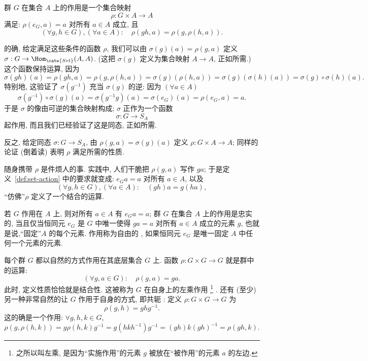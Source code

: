 \begin{definition}
\label{def:set-action}
群 $G$ 在集合 $A$ 上的作用是一个集合映射
\[
\rho : G \times A \to A
\]
满足: $\rho(e_G, a) = a$ 对所有 $a \in A$ 成立, 且
\[
(\forall g, h \in G), (\forall a \in A): \quad \rho(gh, a) = \rho(g, \rho(h, a)).
\]
\end{definition}

的确, 给定满足这些条件的函数 $\rho$, 我们可以由 $\sigma(g)(a) = \rho(g, a)$ 定义 $\sigma : G \to \Hom_{\cate{Set}}(A, A)$. (这把 $\sigma(g)$ 定义为集合映射 $A \to A$, 正如所需.) 这个函数保持运算, 因为
\[
\sigma(gh)(a) = \rho(gh, a) = \rho(g, \rho(h, a)) = \sigma(g)(\rho(h, a)) = \sigma(g)(\sigma(h)(a)) = \sigma(g) \circ \sigma(h)(a).
\]
特别地, 这验证了 $\sigma(g^{-1})$ 充当 $\sigma(g)$ 的逆: 因为 $(\forall a \in A)$
\[
\sigma(g^{-1}) \circ \sigma(g)(a) = \sigma(g^{-1}g)(a) = \sigma(e_G)(a) = \rho(e_G, a) = a.
\]
于是 $\sigma$ 的像由可逆的集合映射构成; $\sigma$ 正作为一个函数
\[
\sigma : G \to S_A
\]
起作用, 而且我们已经验证了这是同态, 正如所需.

反之, 给定同态 $\sigma : G \to S_A$, 由 $\rho(g, a) = \sigma(g)(a)$ 定义 $\rho : G \times A \to A$; 同样的论证 (倒着读) 表明 $\rho$ 满足所需的性质.

随身携带 $\rho$ 是件烦人的事. 实践中, 人们干脆把 $\rho(g, a)$ 写作 $ga$; 于是定义~\ref{def:set-action} 中的要求就变成: $e_G a = a$ 对所有 $a \in A$, 以及
\[
(\forall g, h \in G), (\forall a \in A): \quad (gh)a = g(ha),
\]
``仿佛''$\rho$ 定义了一个结合的运算.

若 $G$ 作用在 $A$ 上, 则对所有 $a \in A$ 有 $e_G a = a$; 群 $G$ 在集合 $A$ 上的作用是忠实的, 当且仅当恒同元 $e_G$ 是 $G$ 中唯一使得 $ga = a$ 对所有 $a \in A$ 成立的元素 $g$, 也就是说,``固定''$A$ 的每个元素. 作用称为自由的%
, 如果恒同元 $e_G$ 是唯一固定 $A$ 中任何一个元素的元素.

\begin{example}
\label{ex:left-multiplication}
每个群 $G$ 都以自然的方式作用在其底层集合 $G$ 上. 函数 $\rho : G \times G \to G$ 就是群中的运算:
\[
(\forall g, a \in G): \quad \rho(g, a) = ga.
\]
此时, 定义性质恰恰就是结合性. 这被称为 $G$ 在自身上的左乘作用%
\footnote{之所以叫左乘, 是因为``实施作用''的元素 $g$ 被放在``被作用''的元素 $a$ 的左边.}%
. 还有 (至少) 另一种非常自然的让 $G$ 作用于自身的方式, 即共轭%
: 定义 $\rho : G \times G \to G$ 为
\[
\rho(g, h) = ghg^{-1}.
\]
这的确是一个作用: $\forall g, h, k \in G$,
\[
\rho(g, \rho(h, k)) = g \rho(h, k) g^{-1} = g(hkh^{-1})g^{-1} = (gh)k(gh)^{-1} = \rho(gh, k).
\]
\end{example}

